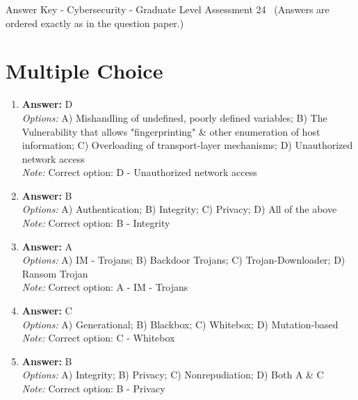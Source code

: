\documentclass[12pt]{article}
\begin{document}
\begin{center}
Answer Key - Cybersecurity - Graduate Level Assessment 24 \
\small (Answers are ordered exactly as in the question paper.)
\end{center}

\section*{Multiple Choice}
\begin{enumerate}[label=\arabic*.]
\item \textbf{Answer:} D
\\ \textit{Options:} A) Mishandling of undefined, poorly defined variables; B) The Vulnerability that allows "fingerprinting" \& other enumeration of host information; C) Overloading of transport-layer mechanisms; D) Unauthorized network access
\\ \textit{Note:} Correct option: D - Unauthorized network access
\item \textbf{Answer:} B
\\ \textit{Options:} A) Authentication; B) Integrity; C) Privacy; D) All of the above
\\ \textit{Note:} Correct option: B - Integrity
\item \textbf{Answer:} A
\\ \textit{Options:} A) IM - Trojans; B) Backdoor Trojans; C) Trojan-Downloader; D) Ransom Trojan
\\ \textit{Note:} Correct option: A - IM - Trojans
\item \textbf{Answer:} C
\\ \textit{Options:} A) Generational; B) Blackbox; C) Whitebox; D) Mutation-based
\\ \textit{Note:} Correct option: C - Whitebox
\item \textbf{Answer:} B
\\ \textit{Options:} A) Integrity; B) Privacy; C) Nonrepudiation; D) Both A \& C
\\ \textit{Note:} Correct option: B - Privacy
\end{enumerate}
\end{document}
